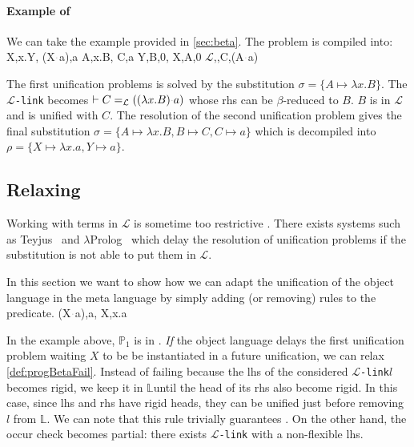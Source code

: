 \documentclass[sigconf,natbib=false,review]{acmart}
\newcommand{\appsep}{\ensuremath{\textcolor{lightgray}{\cdot}}}
\newcommand{\llambda}{\ensuremath{\mathcal{L}}\xspace}
\newcommand{\linkMacro}[1]{\ensuremath{#1}\texttt{-link}\xspace}
\newcommand{\linkbeta}{\linkMacro{\llambda}}
\newcommand{\linkbetaM}[3]{\ensuremath{#1 \vdash #2 =_{\llambda} #3}}
\newcommand{\lhs}{lhs\xspace}
\newcommand{\rhs}{rhs\xspace}
\newcommand{\linkStore}{\texorpdfstring{\ensuremath{\mathbb{L}}\xspace}{L}}
\newcommand{\foUnifPb}{\ensuremath{\mathbb{P}}\xspace}
\begin{document}
\paragraph{Example of \progBetaRH}
We can take the example provided in \cref{sec:beta}. The problem is compiled
into:
%
\printAlll
  {{{X,\lambda x.Y},
    {(X\appsep a),a}}}
  {{{A,\lambda x.B},
    {C,a}}}
  {{{Y,B,0},
    {X,A,0}}}
  {{{\llambda,,C,(A\appsep a)}}}


The first unification problems is solved by the substitution $\sigma = \{A
\mapsto \lambda x.B\}$. The \linkbeta becomes
\linkbetaM{}{C}{((\lambda x.B) \appsep a)} whose \rhs can be $\beta$-reduced to
$B$. $B$ is in \llambda and is unified with $C$. The resolution of the second
unification problem
gives the final substitution $\sigma = \{A \mapsto \lambda x.B, B \mapsto C, C
\mapsto a\}$ which is decompiled into $\rho = \{X \mapsto \lambda x.a, Y \mapsto
a\}$.
 
\subsection{\texorpdfstring{Relaxing }{Relaxing progress-llam-fail}}

\newcommand{\progBetaNoLLWait}{\emph{progress-beta-\notllambda}}

Working with terms in \llambda is sometime too restrictive \cite{Abel2018ExtensionsTM}. 
There exists systems
such as Teyjus~\cite{Nadathur2001} and $\lambda$Prolog~\cite{lamProlog} which 
delay the resolution of \notllambda unification problems if the substitution
is not able to put them in \llambda.

In this section we want to show how we can adapt the unification of the object
language in the meta language by simply adding (or removing) rules to the
 predicate.
%
\printAlll
  {{{(X\appsep a),a},
    {X,\lambda x.a}}}
  {{}}
  {{}}
  {{}}

In the example above, $\foUnifPb_1$ is in \notllambda. \emph{If} the object
language delays the first unification problem waiting $X$ to be
be instantiated in a future unification, we can relax \cref{def:progBetaFail}. 
Instead of failing because the \lhs of the considered \linkbeta $l$ becomes rigid,
we keep it in \linkStore until the head of its \rhs also become rigid.
In this case, since \lhs and \rhs have rigid heads, they can be unified
just before removing $l$ from \linkStore. We can note that this rule trivially
guarantees . On the other hand, the occur check becomes 
partial: there exists \linkbeta with a non-flexible \lhs.
\end{document}
